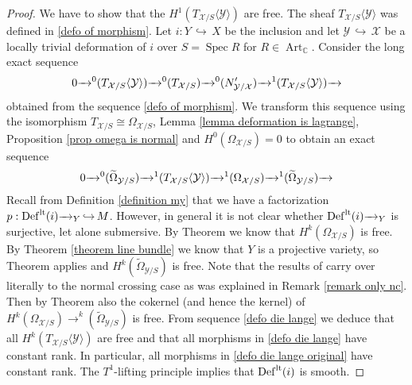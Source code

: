 \documentclass[a4paper,11pt,final]{amsart}
\theoremstyle{plain}
\theoremstyle{definition}
\numberwithin{equation}{section}
\theoremstyle{remark}
\begin{document}
\begin{proof}

We have to show that the $H^1(T_{{{\mathcal X}}/S}\langle {{\mathcal Y}}\rangle)$ are free. The sheaf $T_{{{\mathcal X}}/S}\langle {{\mathcal Y}}\rangle$ was defined in \eqref{defo of morphism}.
Let $i:Y{{\, \hookrightarrow\,}} X$ be the inclusion and let ${{\mathcal Y}}{{\, \hookrightarrow\,}} {{\mathcal X}}$ be a locally trivial deformation of $i$ over $S = {\operatorname{Spec}} R$ for $R\in {\operatorname{Art}}_{{\mathbb C}}$. Consider the long exact sequence
\begin{equation}\label{defo die lange original}
0 {\xrightarrow{\ \ }}^0(T_{{{\mathcal X}}/S}\langle {{\mathcal Y}}\rangle) {\xrightarrow{\ \ }}^0(T_{{{\mathcal X}}/S}) {\xrightarrow{\ \ }}^0(N'_{{{\mathcal Y}}/{{\mathcal X}}}) {\xrightarrow{\ \ }}^1(T_{{{\mathcal X}}/S}\langle {{\mathcal Y}}\rangle) {\xrightarrow{\ \ }}\\
\end{equation}
obtained from the sequence \eqref{defo of morphism}. We transform this sequence using the isomorphism $T_{{{\mathcal X}}/S} {\cong} \Omega_{{{\mathcal X}}/S}$, Lemma \ref{lemma deformation is lagrange}, Proposition \ref{prop omega is normal} and $H^0(\Omega_{{{\mathcal X}}/S})=0$ to obtain an exact sequence
\begin{equation}\label{defo die lange}
0{\xrightarrow{\ \ }}^0({\widetilde{\Omega}}_{{{\mathcal Y}}/S}) {\xrightarrow{\ \ }}^1(T_{{{\mathcal X}}/S}\langle {{\mathcal Y}}\rangle) {\xrightarrow{\ \ }}^1(\Omega_{{{\mathcal X}}/S}) {\xrightarrow{\ \ }}^1({\widetilde{\Omega}}_{{{\mathcal Y}}/S}) {\xrightarrow{\ \ }}\\
\end{equation}
Recall from Definition \ref{definition my} that we have a factorization $p:{{\operatorname{Def}}}^{{\rm{lt}}}(i) {\xrightarrow{\ \ }}_Y {{\, \hookrightarrow\,}} M$. However, in general it is not clear whether ${{\operatorname{Def}}}^{{\rm{lt}}}(i) {\xrightarrow{\ \ }}_Y$ is surjective, let alone submersive.
By Theorem \cite[Th\'eor\`eme 5.5]{De68} we know that $H^k(\Omega_{{{\mathcal X}}/S})$ is free. By Theorem \ref{theorem line bundle} we know that $Y$ is a projective variety, so Theorem \cite[Theorem 4.13]{CL12} applies and $H^k({\widetilde{\Omega}}_{{{\mathcal Y}}/S})$ is free. Note that the results of \cite{CL12} carry over literally to the normal crossing case as was explained in Remark \ref{remark only nc}. Then by Theorem \cite[Theorem 4.22]{CL12} also the cokernel (and hence the kernel) of $H^k(\Omega_{{{\mathcal X}}/S}) {\xrightarrow{\ \ }}^k({\widetilde{\Omega}}_{{{\mathcal Y}}/S})$ is free. From sequence \eqref{defo die lange} we deduce that all $H^k(T_{{{\mathcal X}}/S}\langle {{\mathcal Y}}\rangle)$ are free and that all morphisms in \eqref{defo die lange} have constant rank. In particular, all morphisms in \eqref{defo die lange original} have constant rank. The $T^1$-lifting principle implies that ${{\operatorname{Def}}}^{{\rm{lt}}}(i)$ is smooth. 


\end{proof}
\end{document}
